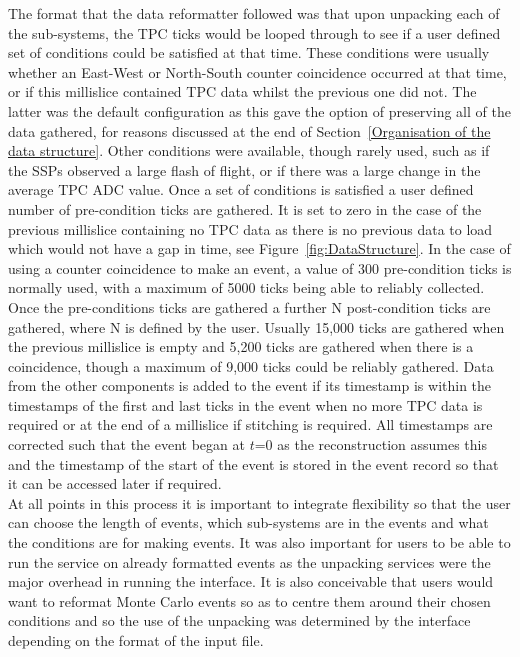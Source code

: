 The format that the data reformatter followed was that upon unpacking each of the sub-systems, the TPC ticks would be looped through to see if a user defined set of conditions could be satisfied at that time. These conditions were usually whether an East-West or North-South counter coincidence occurred at that time, or if this millislice contained TPC data whilst the previous one did not. The latter was the default configuration as this gave the option of preserving all of the data gathered, for reasons discussed at the end of Section~\ref{Organisation of the data structure}. Other conditions were available, though rarely used, such as if the SSPs observed a large flash of flight, or if there was a large change in the average TPC ADC value. Once a set of conditions is satisfied a user defined number of pre-condition ticks are gathered. It is set to zero in the case of the previous millislice containing no TPC data as there is no previous data to load which would not have a gap in time, see Figure~\ref{fig:DataStructure}. In the case of using a counter coincidence to make an event, a value of 300 pre-condition ticks is normally used, with a maximum of 5000 ticks being able to reliably collected. Once the pre-conditions ticks are gathered a further N post-condition ticks are gathered, where N is defined by the user. Usually 15,000 ticks are gathered when the previous millislice is empty and 5,200 ticks are gathered when there is a coincidence, though a maximum of 9,000 ticks could be reliably gathered. Data from the other components is added to the event if its timestamp is within the timestamps of the first and last ticks in the event when no more TPC data is required or at the end of a millislice if stitching is required. All timestamps are corrected such that the event began at $t$=0 as the reconstruction assumes this and the timestamp of the start of the event is stored in the event record so that it can be accessed later if required. \\

At all points in this process it is important to integrate flexibility so that the user can choose the length of events, which sub-systems are in the events and what the conditions are for making events. It was also important for users to be able to run the service on already formatted events as the unpacking services were the major overhead in running the interface. It is also conceivable that users would want to reformat Monte Carlo events so as to centre them around their chosen conditions and so the use of the unpacking was determined by the interface depending on the format of the input file.

